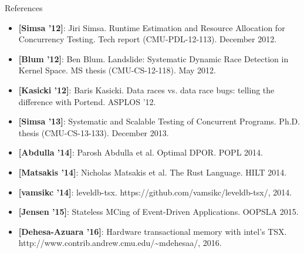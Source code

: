 \documentclass[xcolor=dvipsnames]{beamer}
\begin{document}
\begin{frame}{References}
	\footnotesize
	\begin{itemize}
		\item {\bf [Simsa '12]}: Jiri Simsa. Runtime Estimation and Resource Allocation for
			Concurrency Testing. Tech report (CMU-PDL-12-113). December 2012.
		\item {\bf [Blum '12]}: Ben Blum. Landslide: Systematic Dynamic Race Detection in Kernel Space.
			MS thesis (CMU-CS-12-118). May 2012.
		\item {\bf [Kasicki '12]}: Baris Kasicki. Data races vs. data race bugs: telling the difference with Portend. ASPLOS '12.
		\item {\bf [Simsa '13]}: Systematic and Scalable Testing of Concurrent Programs.
			Ph.D. thesis (CMU-CS-13-133). December 2013.
		\item {\bf [Abdulla '14]}: Parosh Abdulla et al. Optimal DPOR. POPL 2014.
		\item {\bf [Matsakis '14]}: Nicholas Matsakis et al. The Rust Language. HILT 2014.
		\item {\bf [vamsikc '14]}: leveldb-tsx. https://github.com/vamsikc/leveldb-tsx/, 2014.
		\item {\bf [Jensen '15]}: Stateless MCing of Event-Driven Applications. OOPSLA 2015.
		\item {\bf [Dehesa-Azuara '16]}: Hardware transactional memory with intel's TSX.
			http://www.contrib.andrew.cmu.edu/\textasciitilde{}mdehesaa/, 2016.
	\end{itemize}
\end{frame}
\end{document}
